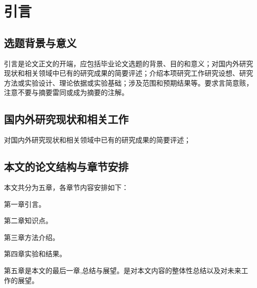\chapter{引言}
\label{cha:introduction}
\section{选题背景与意义}
\label{sec:background}
引言是论文正文的开端，应包括毕业论文选题的背景、目的和意义；对国内外研究现状和相关领域中已有的研究成果的简要评述；介绍本项研究工作研究设想、研究方法或实验设计、理论依据或实验基础；涉及范围和预期结果等。要求言简意赅，注意不要与摘要雷同或成为摘要的注解。

\section{国内外研究现状和相关工作}
\label{sec:related_work}
对国内外研究现状和相关领域中已有的研究成果的简要评述；
\section{本文的论文结构与章节安排}

\label{sec:arrangement}
本文共分为五章，各章节内容安排如下：

第一章引言。

第二章知识点。

第三章方法介绍。

第四章实验和结果。

第五章是本文的最后一章,总结与展望。是对本文内容的整体性总结以及对未来工作的展望。

